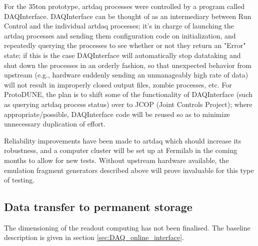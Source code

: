 For the 35ton prototype, artdaq processes were controlled by a program called
DAQInterface. DAQInterface can be thought of as an intermediary
between Run Control and the individual artdaq processes; it's in
charge of launching the artdaq processes and sending them
configuration code on initialization, and repeatedly querying the
processes to see whether or not they return an "Error" state; if this
is the case DAQInterface will automatically stop datataking and shut
down the processes in an orderly fashion, so that unexpected behavior
from upstream (e.g., hardware suddenly sending an unmanageably high
rate of data) will not result in improperly closed output files,
zombie processes, etc. For ProtoDUNE, the plan is to shift some of the functionality of DAQInterface (such as querying artdaq process status) over to JCOP (Joint Controls Project);
 where appropriate/possible, DAQInterface code will be reused so as to minimize unnecessary duplication of effort. 

Reliability improvements have been made to
artdaq which should increase its robustness, and a computer cluster will be set up at Fermilab in the
coming months to allow for new tests. Without upstream hardware
available, the emulation fragment generators described above will
prove invaluable for this type of testing.




\subsection{Data transfer to permanent storage}


The dimensioning of the readout computing has not been finalised.  The 
baseline description is given in section \ref{sec:DAQ_online_interface}.



